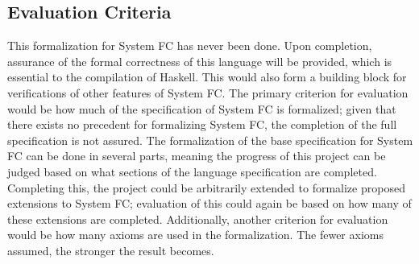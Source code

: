\documentclass{sig-alternate}
\begin{document}
\subsection{Evaluation Criteria}
\label{subsec:eval_criteria}
This formalization for System FC has never been done. Upon completion, assurance of the formal correctness of this language will be provided, which is essential to the compilation of Haskell. This would also form a building block for verifications of other features of System FC.
The primary criterion for evaluation would be how much of the specification of System FC is formalized; given that there exists no precedent for formalizing System FC, the completion of the full specification is not assured. The formalization of the base specification for System FC can be done in several parts, meaning the progress of this project can be judged based on what sections of the language specification are completed. Completing this, the project could be arbitrarily extended to formalize proposed extensions to System FC; evaluation of this could again be based on how many of these extensions are completed. Additionally, another criterion for evaluation would be how many axioms are used in the formalization. The fewer axioms assumed, the stronger the result becomes.
\end{document}
